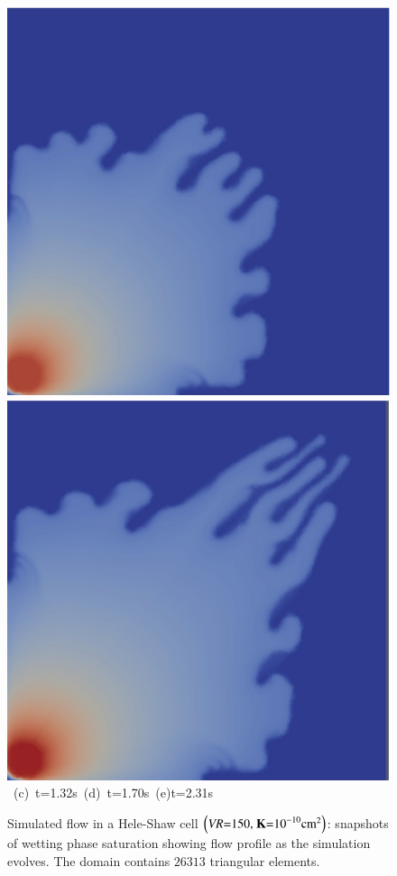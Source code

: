 \begin{landscape}
\begin{figure}[ht]
{{      \includegraphics[width=.5\textwidth]{./Pics1/Saffman_homogeneous_VR150/ST_Homog_VR150_D4000b.pdf}
      \includegraphics[width=.51\textwidth]{./Pics1/Saffman_homogeneous_VR150/ST_Homog_VR150_D7000b.pdf}}
\vspace{0.cm}
\hbox{ \hspace{2.cm} (c) t=1.32s \hspace{4.5cm} (d) t=1.70s \hspace{5.cm} (e)t=2.31s}
\vspace{0.cm}
}   
\caption{Simulated flow in a Hele-Shaw cell $\left(\text{{\it VR}=150, {\bf K}=10}^{-10}\text{cm}^{2}\right)$: snapshots of wetting phase saturation showing flow profile as the simulation evolves. The domain contains $26313$  triangular elements.}
\label{fig:homoheleshaw_VN150}
\end{figure}
\end{landscape}
\clearpage



